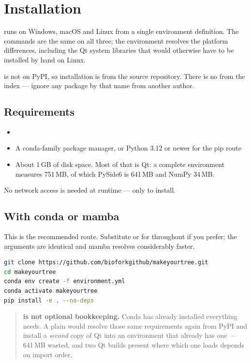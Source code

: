 \chapter{Installation}
\label{ch:installation}

\app{} runs on Windows, macOS and Linux from a single environment definition. The
commands are the same on all three; the environment resolves the platform
differences, including the Qt system libraries that would otherwise have to be
installed by hand on Linux.

\app{} is not on PyPI, so installation is from the source repository. There is no
 from the index --- ignore any package by that name
from another author.

\section{Requirements}

\begin{itemize}
  \item {}
  \item A conda-family package manager, or Python 3.12 or newer for the pip route
  \item About 1\,GB of disk space. Most of that is Qt: a complete environment
        measures 751\,MB, of which PySide6 is 641\,MB and NumPy 34\,MB.
\end{itemize}

No network access is needed at runtime --- only to install.

\section{With conda or mamba}

This is the recommended route. Substitute  or  for
 throughout if you prefer; the arguments are identical and mamba
resolves considerably faster.

\begin{lstlisting}[language=bash]
git clone https://github.com/bioforkgithub/makeyourtree.git
cd makeyourtree
conda env create -f environment.yml
conda activate makeyourtree
pip install -e . --no-deps
\end{lstlisting}

\begin{quote}
\textbf{ is not optional bookkeeping.} Conda has already installed
everything \app{} needs. A plain  would resolve those same
requirements again from PyPI and install a \emph{second} copy of Qt into an
environment that already has one --- 641\,MB wasted, and two Qt builds present
where which one loads depends on import order.
\end{quote}


